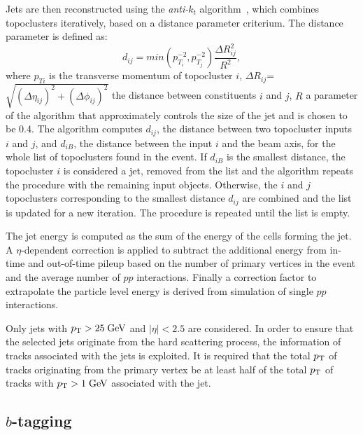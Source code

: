 Jets are then reconstructed using the {\it anti-$k_t$}
algorithm~\cite{antiktalgo}, which combines topoclusters iteratively,
based on a distance parameter criterium. The distance parameter is
defined as:
\begin{equation}
d_{ij}=min(p_{T_i}^{-2},p_{T_j}^{-2})\frac{\Delta R_{ij}^{2}}{R^{2}},
\end{equation}
where $p_{Ti}$ is the transverse momentum of topocluster $i$, 
$\Delta R_{ij}$=$\sqrt{(\Delta\eta_{ij})^{2}+(\Delta\phi_{ij})^{2}}$ the distance 
between constituents $i$ and
$j$, $R$ a parameter of the algorithm that approximately controls the size
of the jet and is chosen to be 0.4.
The algorithm computes $d_{ij}$, the distance between two topocluster
inputs $i$ and $j$, and $d_{iB}$,  the distance between the input $i$
and the beam axis, for the whole list of topoclusters found in the
event. If $d_{iB}$ is the smallest distance, the
topocluster $i$ is considered a jet, removed from the list and the
algorithm repeats the procedure with the remaining input objects.
Otherwise, the $i$ and $j$ topoclusters corresponding to the smallest
distance $d_{ij}$ are combined and the list is updated for a new
iteration.
The procedure is repeated until the list is empty.

The jet energy is computed as the sum of the energy of the cells
forming the jet.
A $\eta$-dependent correction is applied to subtract the additional
energy from in-time and out-of-time pileup based on the number of
primary vertices in the event and the average number of $pp$
interactions.
Finally a correction factor to extrapolate the particle level energy
is derived from simulation of single $pp$ interactions.

Only jets with $p_{\mathrm{T}}{}>25 \; \mathrm{GeV}{}$ and $|\eta|<2.5$ are considered. In
order to ensure that the selected jets originate from the hard
scattering process, the information of tracks associated with the jets
is exploited.
It is required that the total $p_{\mathrm{T}}{}$ of tracks originating from the
primary vertex be at least half of the total $p_{\mathrm{T}}$ of tracks with
$p_{\mathrm{T}}{}>1\; \mathrm{GeV}{}$ associated with the jet.

\subsection{$b$-tagging}
\label{sec:btag}

